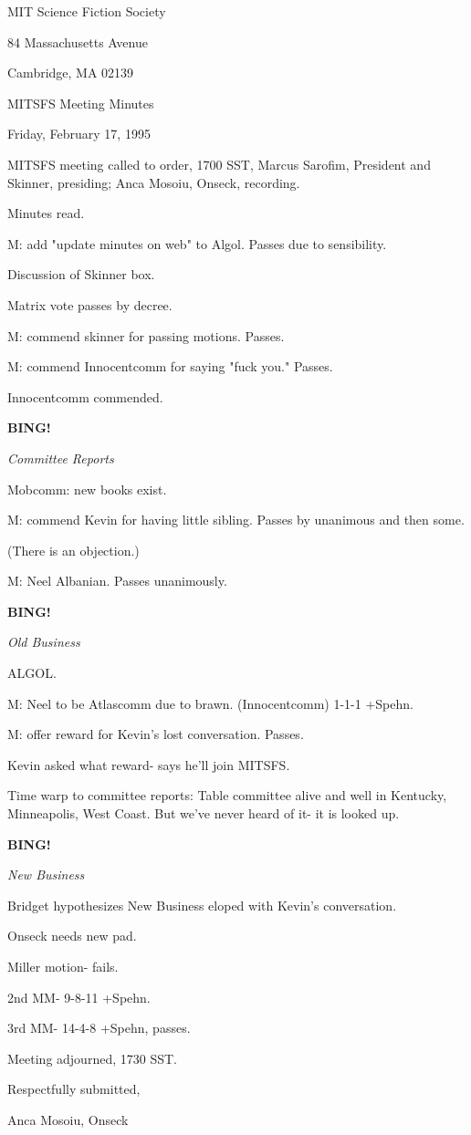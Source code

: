\documentclass[12pt]{article}
\newcommand{\bing}{{\bf BING!} }
\newcommand{\goto}[1]{\bing \vskip 12pt \centerline{{\em{#1}}}}
\begin{document}
\begin{center}

MIT Science Fiction Society 

84 Massachusetts Avenue

Cambridge, MA 02139

\vspace{12pt}

MITSFS Meeting Minutes 

Friday, February 17, 1995

\end{center}
 
\vspace{18pt}

\setlength{\parskip}{6pt}

\noindent
MITSFS meeting called to order, 1700 SST,
Marcus Sarofim, President and Skinner, presiding; Anca Mosoiu, Onseck, recording.

Minutes read.

M: add "update minutes on web" to Algol. Passes due to sensibility.

Discussion of Skinner box.

Matrix vote passes by decree.

M: commend skinner for passing motions. Passes.

M: commend Innocentcomm for saying "fuck you." Passes.

Innocentcomm commended.

\goto{Committee Reports}

Mobcomm: new books exist.

M: commend Kevin for having little sibling. Passes by unanimous and then some.

(There is an objection.)

M: Neel Albanian. Passes unanimously.

\goto{Old Business}

ALGOL.

M: Neel to be Atlascomm due to brawn. (Innocentcomm) 1-1-1 +Spehn.

M: offer reward for Kevin's lost conversation. Passes.

Kevin asked what reward- says he'll join MITSFS.

Time warp to committee reports: Table committee alive and well in Kentucky, Minneapolis, West Coast. But we've never heard of it- it is looked up.

\goto{New Business}

Bridget hypothesizes New Business eloped with Kevin's conversation.

Onseck needs new pad.

Miller motion- fails.

2nd MM- 9-8-11 +Spehn.

3rd MM- 14-4-8 +Spehn, passes.

\vspace{12pt}

\noindent
Meeting adjourned, 1730 SST.

\vspace{18pt}

\centerline{Respectfully submitted,}
\centerline{Anca Mosoiu, Onseck}
\end{document}
